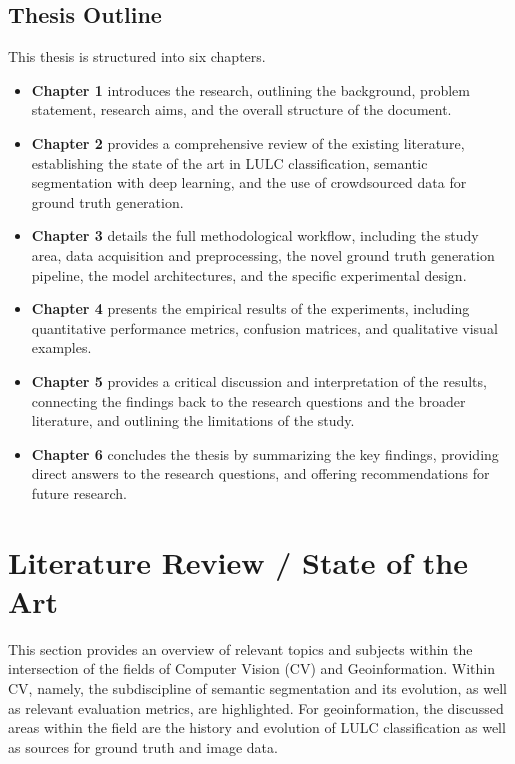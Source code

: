 \documentclass{report}
\begin{document}
\subsection{Thesis Outline}
This thesis is structured into six chapters.
\begin{itemize}
\item \textbf{Chapter 1} introduces the research, outlining the background, problem statement, research aims, and the overall structure of the document.
\item \textbf{Chapter 2} provides a comprehensive review of the existing literature, establishing the state of the art in LULC classification, semantic segmentation with deep learning, and the use of crowdsourced data for ground truth generation.
\item \textbf{Chapter 3} details the full methodological workflow, including the study area, data acquisition and preprocessing, the novel ground truth generation pipeline, the model architectures, and the specific experimental design.
\item \textbf{Chapter 4} presents the empirical results of the experiments, including quantitative performance metrics, confusion matrices, and qualitative visual examples.
\item \textbf{Chapter 5} provides a critical discussion and interpretation of the results, connecting the findings back to the research questions and the broader literature, and outlining the limitations of the study.
\item \textbf{Chapter 6} concludes the thesis by summarizing the key findings, providing direct answers to the research questions, and offering recommendations for future research.
\end{itemize}
\clearpage %
\section{Literature Review / State of the Art}
This section provides an overview of relevant topics and subjects within the intersection of the fields of Computer Vision (CV) and Geoinformation. Within CV, namely, the subdiscipline of semantic segmentation and its evolution, as well as relevant evaluation metrics, are highlighted. For geoinformation, the discussed areas within the field are the history and evolution of LULC classification as well as sources for ground truth and image data.
\end{document}
